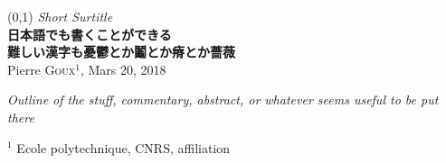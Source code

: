 \begin{frame}[plain]{}
\begin{center}
\boxput*(0,1){
    \colorbox{white}{\textcolor{bleu303}{\large{\textit{Short Surtitle}}}}
}{    
\setlength{\fboxsep}{5pt}
}\\
\vspace*{.5em}
\centering
{\large{\textbf{日本語でも書くことができる\\\vspace{.5em}
\textcolor{bleu303}{難しい漢字も憂鬱とか鬮とか瘠とか薔薇}}}}\\
\vspace*{1.5em}
Pierre \textsc{Goux}$^1$, Mars 20, 2018 \\
\vspace{1em}
    
\textit{\small{Outline of the stuff, commentary, abstract, or whatever seems useful to be put there } }
\end{center}
\vspace{.5em}
\begin{flushright}
\footnotesize $^1$ Ecole polytechnique, CNRS, affiliation
\end{flushright}

\end{frame}


